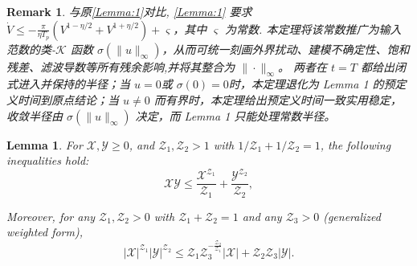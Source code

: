 \documentclass[pdflatex,sn-mathphys-num]{sn-jnl}%
\theoremstyle{thmstyleone}%
\newtheorem{lemma}{Lemma}
\theoremstyle{thmstyletwo}%
\newtheorem{remark}{Remark}%
\theoremstyle{thmstylethree}%
\begin{document}
	\begin{remark}
	与原\cref{Lemma:1}对比, \cref{Lemma:1} 要求 $\dot V \le -\frac{\pi}{\eta T_p}(V^{1-\eta/2}+V^{1+\eta/2})+\varsigma$，其中 $\varsigma$ 为常数.
	  本定理将该常数推广为输入范数的类-$\mathcal{K}$ 函数 $\sigma(\|u\|_\infty)$，从而可统一刻画外界扰动、建模不确定性、饱和残差、滤波导数等所有残余影响,并将其整合为 $\|\cdot\|_\infty$。
	   两者在 $t=T$ 都给出闭式进入并保持的半径；当 $u=0$或 $\sigma(0)=0$时，本定理退化为 Lemma 1 的预定义时间到原点结论；当 $u\not=0$ 而有界时，本定理给出预定义时间一致实用稳定，收敛半径由 $\sigma(\|u\|_\infty)$ 决定，而 Lemma 1 只能处理常数半径。
	\end{remark}
	
	







\begin{lemma}	\label{lemma:2} \cite{TeeEtAl_2009_Barrierlyapunova} For $\mathcal{X}, \mathcal{Y}  \geq 0$, and $ \mathcal{Z}_1 ,  \mathcal{Z}_2> 1$ with ${1}/{ \mathcal{Z}_1} + {1}/{ \mathcal{Z}_2} = 1$, the following inequalities hold:
	\begin{equation}\label{eq:9}
		\mathcal{X} \mathcal{Y}  \leq \frac{\mathcal{X}^{ \mathcal{Z}_1}}{ \mathcal{Z}_1} + \frac{\mathcal{Y} ^{ \mathcal{Z}_2}}{ \mathcal{Z}_2},
	\end{equation}
	 
	Moreover, for any $\mathcal{Z}_{1},\mathcal{Z}_{2}>0$ with $\mathcal{Z}_{1}+\mathcal{Z}_{2}=1$ and any $\mathcal{Z}_{3}>0$ (generalized weighted form),
	\begin{equation}\label{eq:10}
		|\mathcal{X}|^{ \mathcal{Z}_{1}}|\mathcal{Y} |^{ \mathcal{Z}_{2}}\leq  \mathcal{Z}_{1} \mathcal{Z}_{3}^{-\frac{ \mathcal{Z}_{2}}{ \mathcal{Z}_{1}}}|\mathcal{X}|+ \mathcal{Z}_{2}  \mathcal{Z}_{3}|\mathcal{Y} |.
	\end{equation} 
\end{lemma}  
\end{document}

